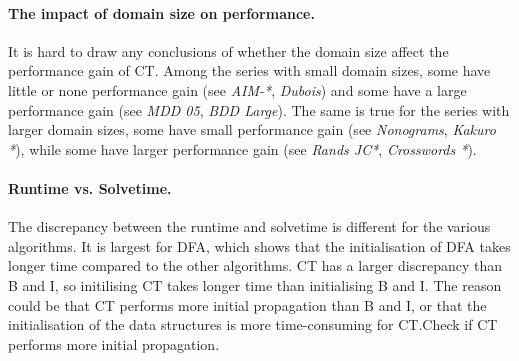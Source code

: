 \documentclass[a4paper,11pt]{article}
\newcommand{\Todo}[1]{{\color{blue}#1}}
\numberwithin{equation}{section}
\begin{document}







\paragraph{The impact of domain size on performance.}
It is hard to draw any conclusions of whether the domain size affect
the performance gain of CT. Among the series with small domain sizes, some
have little or none performance gain (see \emph{AIM-*}, \emph{Dubois}) and
some have a large performance gain (see \emph{MDD 05}, \emph{BDD Large}).
The same is true for the series with larger domain sizes, some have
small performance gain (see \emph{Nonograms}, \emph{Kakuro *}),
while some have larger performance gain (see \emph{Rands JC*}, \emph{Crosswords *}).


\paragraph{Runtime vs. Solvetime.}
The discrepancy between the runtime and solvetime is different for the various
algorithms. It is largest for DFA, which shows that the initialisation of DFA
takes longer time compared to the other algorithms.
CT has a larger discrepancy than B and I, so initilising CT takes longer time
than initialising B and I. The reason could be that CT performs more initial propagation
than B and I, or that the initialisation of the data structures is more time-consuming
for CT.\Todo{Check if CT performs more initial propagation}.
\end{document}

